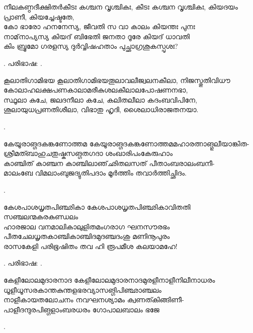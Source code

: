 \begin{enumerate}



\begin{slokam}{\VSv}{നീലകണ്ഠദീക്ഷിതർ}{കീടഃ കശ്ചന വൃശ്ചികഃ,}
കീടഃ കശ്ചന വൃശ്ചികഃ, കിയദയം പ്രാണീ, കിയച്ചേഷ്ടതേ,\\
കോ ഭാരോ ഹനനേ\prash{}സ്യ, ജീവതി സ വാ കാലം കിയന്തഃ പുനഃ\\
നാമ്‌നാപ്യസ്യ കിയദ്‌ ബിഭേതി ജനതാ ദൂരേ കിയദ്‌ ധാവതി\\
കിം ബ്രൂമോ ഗരളസ്യ ദുർവ്വിഷഹതാം പുച്ഛാഗ്രശൂകസ്പൃശഃ?
\end{slokam}



. പരിഭാഷ: . 


\begin{slokam}{\VMt}{\Sank}{കൂലാതിഗാമിഭയ}
കൂലാതിഗാമിഭയതൂലാവലീജ്വലനകീലാ, നിജസ്തുതിവിധൗ\\
കോലാഹലക്ഷപണകാലാമരീകുശലകീലാലപോഷണനഭാ,\\
സ്ഥൂലാ കുചേ, ജലദനീലാ കചേ, കലിതലീലാ കദംബവിപിനേ,\\
ശൂലായുധപ്രണതിശീലാ, വിഭാതു ഹൃദി, ശൈലാധിരാജതനയാ.
\end{slokam}


.




\begin{slokam}{\VSv}{\Melp}{കേയൂരാങ്ഗദകങ്കണോത്തമ}
കേയൂരാങ്ഗദകങ്കണോത്തമമഹാരത്നാങ്ഗുലീയാങ്കിത-\\
ശ്രീമത്ബാഹുചതുഷ്കസങ്ഗതഗദാ ശംഖാരിപംകേരുഹാം\\
കാഞ്ചിത് കാഞ്ചന കാഞ്ചിലാഞ്‌ഛിതലസത് പീതാംബരാലംബനീ-\\
മാലംബേ വിമലാംബുജദ്യുതിപദാം മൂർത്തിം തവാർത്തിച്ഛിദം.
\end{slokam}


.


\begin{slokam}{\VKm}{\Melp}{കേശപാശധൃതപിഞ്ഛികാ}
കേശപാശധൃതപിഞ്ഛികാവിതതി സഞ്ചലന്മകരകുണ്ഡലം\\
ഹാരജാല വനമാലികാലുളിതമംഗരാഗ ഘനസൗരഭം\\
പീതചേലധൃതകാഞ്ചികാഞ്ചിദമുദഞ്ചദംശു മണിനൂപുരം\\
രാസകേളി പരിഭൂഷിതം തവ ഹി രൂപമീശ കലയാമഹേ!
\end{slokam}



.  പരിഭാഷ: .

\begin{slokam}{\VSv}{\MR}{കേളീലോലമുദാരനാദ}
കേളീലോലമുദാരനാദമുരളീനാളീനിലീനാധരം\\
ധൂളീധൂസരകാന്തകുന്തളഭരവ്യാസങ്ഗിപിഞ്ഛാഞ്ചലം\\
നാളീകായതലോചനം നവഘനശ്യാമം ക്വണത്കിങ്ങിണീ-\\
പാളീദന്ദുരപിങ്ഗളാംബരധരം ഗോപാലബാലം ഭജേ
\end{slokam}


.


\end{enumerate}

